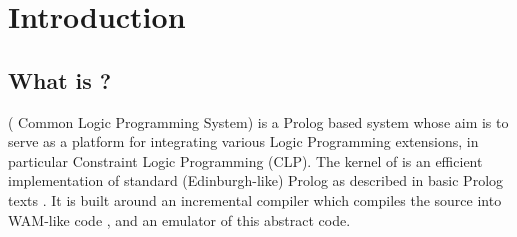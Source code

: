 %
% 
% 
% 
% 
%
%

\chapter{Introduction}
\label{chapintro}

\section{What is {\eclipse} ?}
{\eclipse}{} ({\eclipse} Common Logic Programming System)
is a Prolog based system whose aim is to serve as a platform
for integrating various Logic Programming extensions, in particular
Constraint Logic Programming (CLP).
The kernel of {\eclipse} is an efficient implementation of standard
(Edinburgh-like) Prolog as described in basic Prolog texts \cite{clocksin81}.
It is built around an incremental compiler which compiles the {\eclipse}
source into WAM-like code \cite{warren83}, and an emulator of this abstract code.

